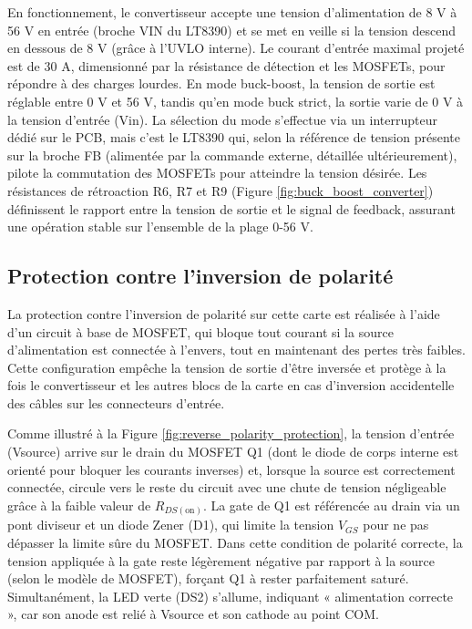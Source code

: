 En fonctionnement, le convertisseur accepte une tension d'alimentation de 8 V à 56 V en entrée (broche VIN du LT8390) et se met en veille si la tension descend en dessous de 8 V (grâce à l'UVLO interne). Le courant d'entrée maximal projeté est de 30 A, dimensionné par la résistance de détection et les MOSFETs, pour répondre à des charges lourdes. En mode buck-boost, la tension de sortie est réglable entre 0 V et 56 V, tandis qu'en mode buck strict, la sortie varie de 0 V à la tension d'entrée (Vin). La sélection du mode s'effectue via un interrupteur dédié sur le PCB, mais c'est le LT8390 qui, selon la référence de tension présente sur la broche FB (alimen­tée par la commande externe, détaillée ultérieurement), pilote la commutation des MOSFETs pour atteindre la tension désirée. Les résistances de rétroaction R6, R7 et R9 (Figure \ref{fig:buck_boost_converter}) définissent le rapport entre la tension de sortie et le signal de feedback, assurant une opération stable sur l'ensemble de la plage 0-56 V.






\subsection{Protection contre l'inversion de polarité}

La protection contre l'inversion de polarité sur cette carte est réalisée à l'aide d'un circuit à base de MOSFET, qui bloque tout courant si la source d'alimentation est connectée à l'envers, tout en maintenant des pertes très faibles. Cette configuration empêche la tension de sortie d'être inversée et protège à la fois le convertisseur et les autres blocs de la carte en cas d'inversion accidentelle des câbles sur les connecteurs d'entrée.

Comme illustré à la Figure \ref{fig:reverse_polarity_protection}, la tension d'entrée (Vsource) arrive sur le drain du MOSFET Q1 (dont le diode de corps interne est orienté pour bloquer les courants inverses) et, lorsque la source est correctement connectée, circule vers le reste du circuit avec une chute de tension négligeable grâce à la faible valeur de \(R_{DS(\text{on})}\). La gate de Q1 est référencée au drain via un pont diviseur et un diode Zener (D1), qui limite la tension \(V_{GS}\) pour ne pas dépasser la limite sûre du MOSFET. Dans cette condition de polarité correcte, la tension appliquée à la gate reste légèrement négative par rapport à la source (selon le modèle de MOSFET), forçant Q1 à rester parfaitement saturé. Simultanément, la LED verte (DS2) s'allume, indiquant « alimentation correcte », car son anode est relié à Vsource et son cathode au point COM.

